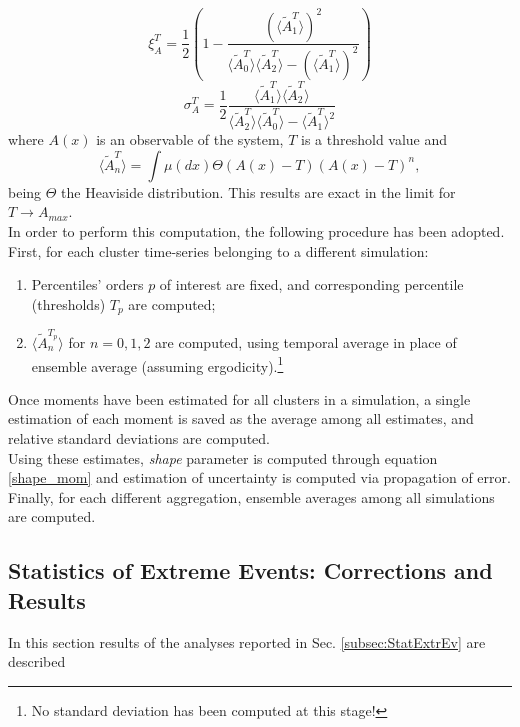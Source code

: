 \documentclass{article}
\begin{document}
\begin{equation}
\xi_A^{T} = \frac{1}{2}\left(1-\frac{(\langle\tilde{A}_1^{T}\rangle)^2}{\langle\tilde{A}_0^T\rangle \langle\tilde{A}_2^T\rangle - (\langle\tilde{A}_1^{T}\rangle)^2} \right) \label{shape_mom}
\end{equation}
\begin{equation}
\sigma_A^{T} = \frac{1}{2} \frac{\langle\tilde{A}_1^T\rangle \langle\tilde{A}_2^T\rangle} {\langle\tilde{A}_2^T\rangle \langle\tilde{A}_0^T\rangle - \langle\tilde{A}_1^{T}\rangle^2}
\end{equation}
where $A(x)$ is an observable of the system, $T$ is a threshold value and
\begin{equation}
\langle\tilde{A}_n^T\rangle = \int\mu(dx)\Theta(A(x)-T)(A(x)-T)^n,
\end{equation}
being $\Theta$ the Heaviside distribution. This results are exact in the limit for $T \rightarrow A_{max}$.\\
In order to perform this computation, the following procedure has been adopted. First, for each cluster time-series belonging to a different simulation:
\begin{enumerate}
	\item Percentiles' orders $p$ of interest are fixed, and corresponding percentile (thresholds) $T_p$ are computed;
	\item $\langle\tilde{A}_n^{T_p}\rangle$ for $n=0,1,2$ are computed, using temporal average in place of ensemble average (assuming ergodicity).\footnote{No standard deviation has been computed at this stage!}
\end{enumerate}
Once moments have been estimated for all clusters in a simulation, a single estimation of each moment is saved as the average among all estimates, and relative standard deviations are computed.\\
Using these estimates, \textit{shape} parameter is computed through equation \ref{shape_mom} and estimation of uncertainty is computed via propagation of error. Finally, for each different aggregation, ensemble averages among all simulations are computed.

\subsection{Statistics of Extreme Events: Corrections and Results}

In this section results of the analyses reported in Sec. \ref{subsec:StatExtrEv} are described
\end{document}
